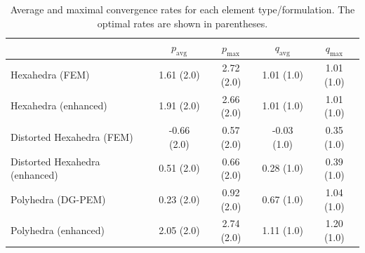 \begin{table}[!ht]
  \begin{center}
    \begin{tabular}{| l || c | c || c | c |}
    \hline
           & $p_{\text{avg}}$ & $p_{\text{max}}$ & $q_{\text{avg}}$ & $q_{\text{max}}$ \\ \hline \hline
    Hexahedra (FEM)                & 1.61 (2.0) & 2.72 (2.0) & 1.01 (1.0) & 1.01 (1.0) \\ \hline
    Hexahedra (enhanced)           & 1.91 (2.0) & 2.66 (2.0) & 1.01 (1.0) & 1.01 (1.0) \\ \hline
    Distorted Hexahedra (FEM)      & -0.66 (2.0) & 0.57 (2.0) & -0.03 (1.0) & 0.35 (1.0) \\ \hline
    Distorted Hexahedra (enhanced) & 0.51 (2.0) & 0.66 (2.0) & 0.28 (1.0) & 0.39 (1.0) \\ \hline
    Polyhedra (DG-PEM)             & 0.23 (2.0) & 0.92 (2.0) & 0.67 (1.0) & 1.04 (1.0) \\ \hline
    Polyhedra (enhanced)           & 2.05 (2.0) & 2.74 (2.0) & 1.11 (1.0) & 1.20 (1.0) \\
    \hline
    \end{tabular}
    \caption{Average and maximal convergence rates for each element type/formulation. The optimal rates are shown in parentheses.}
    \vspace{-5pt}
    \label{tab:twisting_annulus_convergence_rates}
    \vspace{-10pt}
  \end{center}
\end{table}

